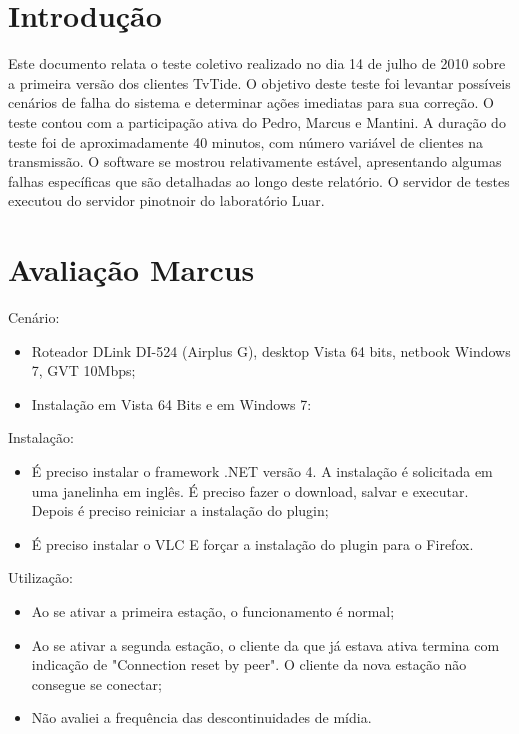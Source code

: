 \documentclass[12pt]{article}
\begin{document}
\maketitle

\section{Introdução}

Este documento relata o teste coletivo realizado no dia 14 de julho de 2010 sobre
a primeira versão dos clientes TvTide. O objetivo deste teste foi levantar possíveis
cenários de falha do sistema e determinar ações imediatas para sua correção.
O teste contou com a participação ativa do Pedro, Marcus e Mantini.
A duração do teste foi de aproximadamente 40 minutos, com número variável
de clientes na transmissão. O software se mostrou relativamente estável,
apresentando algumas falhas específicas que são detalhadas ao longo deste
relatório. O servidor de testes executou do servidor pinotnoir do laboratório
Luar.

\section{Avaliação Marcus}

Cenário:
\begin{itemize}
\item Roteador DLink DI-524 (Airplus G), desktop Vista 64 bits, netbook Windows 7, GVT 10Mbps;
\item Instalação em Vista 64 Bits e em Windows 7:
\end{itemize}

Instalação:
\begin{itemize}
\item É preciso instalar o framework .NET versão 4. A instalação é solicitada em uma janelinha em inglês. É preciso fazer o download, salvar e executar. Depois é preciso reiniciar a instalação do plugin;
\item É preciso instalar o VLC E forçar a instalação do plugin para o Firefox.
\end{itemize}

Utilização:
\begin{itemize}
\item Ao se ativar a primeira estação, o funcionamento é normal;
\item Ao se ativar a segunda estação, o cliente da que já estava ativa termina com indicação de "Connection reset by peer". O cliente da nova estação não consegue se conectar;
\item Não avaliei a frequência das descontinuidades de mídia.
\end{itemize}
\end{document}
